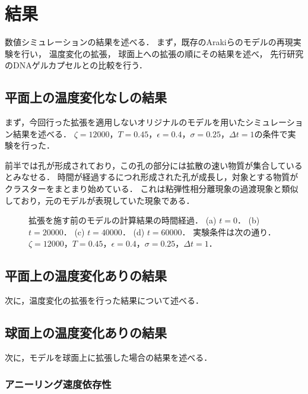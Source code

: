 \chapter{結果}

数値シミュレーションの結果を述べる．
まず，既存のArakiらのモデルの再現実験を行い，
温度変化の拡張，
球面上への拡張の順にその結果を述べ，
先行研究のDNAゲルカプセルとの比較を行う．

\section{平面上の温度変化なしの結果}

まず，今回行った拡張を適用しないオリジナルのモデルを用いたシミュレーション結果を述べる．
$\zeta=12000$，$T=0.45$，$\epsilon=0.4$，$\sigma=0.25$，$\Delta t=1$の条件で実験を行った．

前半では孔が形成されており，この孔の部分には拡散の速い物質が集合しているとみなせる．
時間が経過するにつれ形成された孔が成長し，対象とする物質がクラスターをまとまり始めている．
これは粘弾性相分離現象の過渡現象と類似しており，元のモデルが表現していた現象である．


\begin{figure}
\centering

\caption{
    拡張を施す前のモデルの計算結果の時間経過．
    (a) $t=0$．
    (b) $t=20000$．
    (c) $t=40000$．
    (d) $t=60000$．
    実験条件は次の通り．
    $\zeta=12000$，$T=0.45$，$\epsilon=0.4$，$\sigma=0.25$，$\Delta t=1$．
}
\label{fig:result_2d_without_anearing}
\end{figure}

\section{平面上の温度変化ありの結果}

次に，温度変化の拡張を行った結果について述べる．



\section{球面上の温度変化ありの結果}

次に，モデルを球面上に拡張した場合の結果を述べる．

\subsection{アニーリング速度依存性}


